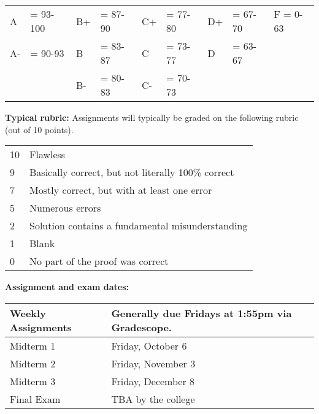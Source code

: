 \documentclass[12pt]{article}
\begin{document}
\begin{center}
  \begin{tabular}{|ll|ll|ll|ll|l|}
\hline
A  &\hspace{-3 pt}\hspace{-7 pt}= 93-100   &B+ &\hspace{-7 pt}= 87-90  &C+ &\hspace{-7 pt}= 77-80 & D+ &\hspace{-7 pt}= 67-70  & F = 0-63\\
A- &\hspace{-3 pt}\hspace{-7 pt}= 90-93    &B  &\hspace{-7 pt}= 83-87  & C &\hspace{-7 pt}= 73-77  & D  &\hspace{-7 pt}= 63-67 &\\
   &                         &B- &\hspace{-7 pt}= 80-83  &C- &\hspace{-7 pt}= 70-73 &    &        &\\
    \hline
  \end{tabular}
\end{center}


\vspace*{.15in}
\noindent\textbf{Typical rubric:} 
Assignments will typically be graded on the following rubric (out of 10 points).

\begin{center}
  \begin{tabular}{|l|l|}
    \hline
    10& Flawless\\
    9& Basically correct, but not literally 100\% correct\\
    7& Mostly correct, but with at least one error\\    
    5& Numerous errors\\
    2& Solution contains a fundamental misunderstanding\\
    1& Blank \\    
    0& No part of the proof was correct\\
    \hline
  \end{tabular}
\end{center}


\newpage
\noindent\textbf{Assignment and exam dates:}

\begin{center}
  \begin{tabular}{|l|l|}
    \hline
    Weekly Assignments & Generally due Fridays at 1:55pm via Gradescope.\\
    \hline
    Midterm 1  & Friday, October 6 \\
    Midterm 2  & Friday, November 3 \\
    Midterm 3  & Friday, December 8 \\             
    Final Exam  & TBA by the college	 \\
    \hline
  \end{tabular}
\end{center}
\end{document}
